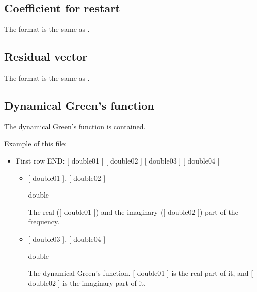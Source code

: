 \documentclass[letterpaper,10pt,dvipdfmx,openany,english]{sphinxmanual}
\begin{document}
\subsection{Coefficient for restart}
\label{\detokenize{shiftk_format_en:coefficient-for-restart}}
The format is the same as {\hyperref[\detokenize{shiftk_format_en:recoeff}]{}}.


\subsection{Residual vector}
\label{\detokenize{shiftk_format_en:id1}}
The format is the same as {\hyperref[\detokenize{shiftk_format_en:revec}]{}}.


\subsection{Dynamical Green’s function}
\label{\detokenize{shiftk_format_en:dynamical-green-s-function}}\label{\detokenize{shiftk_format_en:dynamicalg}}
The dynamical Green’s function is contained.

Example of this file:

\begin{sphinxVerbatim}[commandchars=\\\{\}]
   
   
   
\end{sphinxVerbatim}
\begin{itemize}
\item {} 
First row \sphinxhyphen{} END:
{[} double01 {]} {[} double02 {]} {[} double03 {]} {[} double04 {]}
\begin{itemize}
\item {} 
{[} double01 {]}, {[} double02 {]}

 double

 The real\sphinxhyphen{} ({[} double01 {]})
and the imaginary\sphinxhyphen{} ({[} double02 {]}) part of the frequency.

\item {} 
{[} double03 {]}, {[} double04 {]}

 double

 The dynamical Green’s function.
{[} double01 {]} is the real part of it, and
{[} double02 {]} is the imaginary part of it.

\end{itemize}

\end{itemize}
\end{document}
